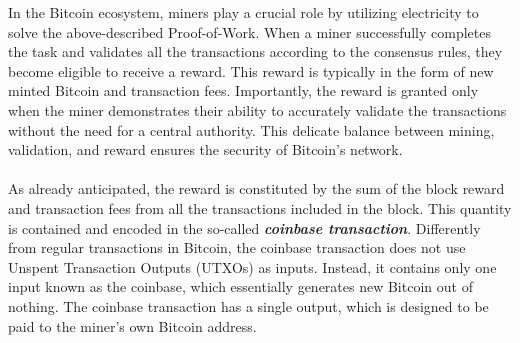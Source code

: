 \noindent In the Bitcoin ecosystem, miners play a crucial role by utilizing electricity to solve the above-described Proof-of-Work. When a miner successfully completes the task and validates all the transactions according to the consensus rules, they become eligible to receive a reward. This reward is typically in the form of new minted Bitcoin and transaction fees. Importantly, the reward is granted only when the miner demonstrates their ability to accurately validate the transactions without the need for a central authority. This delicate balance between mining, validation, and reward ensures the security of Bitcoin's network.\\\\
As already anticipated, the reward is constituted by the sum of the block reward and transaction fees from all the transactions included in the block. This quantity is contained and encoded in the so-called \textbf{\textit{coinbase transaction}}. Differently from regular transactions in Bitcoin, the coinbase transaction does not use Unspent Transaction Outputs (UTXOs) as inputs. Instead, it contains only one input known as the coinbase, which essentially generates new Bitcoin out of nothing. The coinbase transaction has a single output, which is designed to be paid to the miner's own Bitcoin address.

